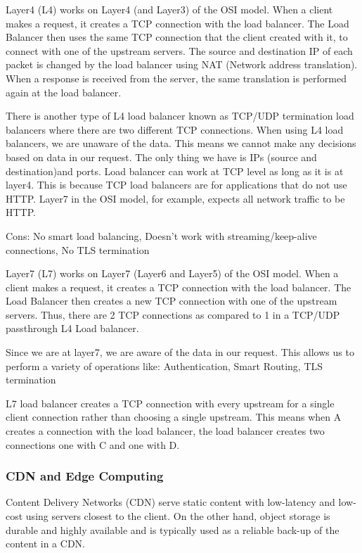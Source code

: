 \documentclass{article}
\begin{document}
    Layer4 (L4) works on Layer4 (and Layer3) of the OSI model. When a client makes a request, it creates a TCP connection with the load balancer. The Load Balancer then uses the same TCP connection that the client created with it, to connect with one of the upstream servers. The source and destination IP of each packet is changed by the load balancer using NAT (Network address translation). When a response is received from the server, the same translation is performed again at the load balancer.
    
    There is another type of L4 load balancer known as TCP/UDP termination load balancers where there are two different TCP connections. When using L4 load balancers, we are unaware of the data. This means we cannot make any decisions based on data in our request. The only thing we have is IPs (source and destination)and ports. Load balancer can work at TCP level as long as it is at layer4. This is because TCP load balancers are for applications that do not use HTTP. Layer7 in the OSI model, for example, expects all network traffic to be HTTP.
    
    Cons: No smart load balancing, Doesn’t work with streaming/keep-alive connections, No TLS termination

    Layer7 (L7) works on Layer7 (Layer6 and Layer5) of the OSI model. When a client makes a request, it creates a TCP connection with the load balancer. The Load Balancer then creates a new TCP connection with one of the upstream servers. Thus, there are 2 TCP connections as compared to 1 in a TCP/UDP passthrough L4 Load balancer.
    
    Since we are at layer7, we are aware of the data in our request. This allows us to perform a variety of operations like: Authentication, Smart Routing, TLS termination
    
    L7 load balancer creates a TCP connection with every upstream for a single client connection rather than choosing a single upstream. This means when A creates a connection with the load balancer, the load balancer creates two connections one with C and one with D.
    
    \subsubsection{CDN and Edge Computing}
    Content Delivery Networks (CDN) serve static content with low-latency and low-cost using servers closest to the client. On the other hand, object storage is durable and highly available and is typically used as a reliable back-up of the content in a CDN.
    
\end{document}
